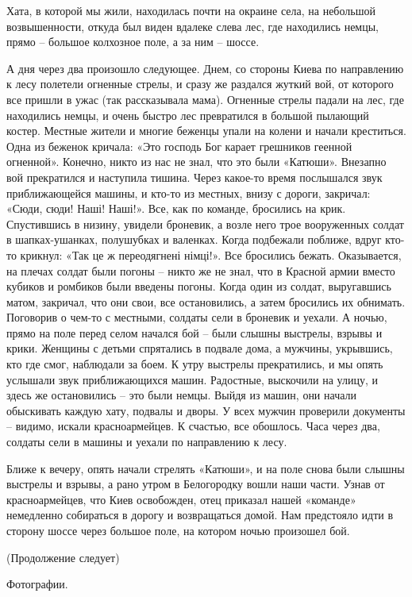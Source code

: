 Хата, в которой мы жили, находилась почти на окраине села, на небольшой
возвышенности, откуда был виден вдалеке слева лес, где находились немцы, прямо
– большое колхозное поле, а за ним – шоссе.

А дня через два произошло следующее. Днем, со стороны Киева по направлению к
лесу полетели огненные стрелы, и сразу же раздался жуткий вой, от которого все
пришли в ужас (так рассказывала мама). Огненные стрелы падали на лес, где
находились немцы, и очень быстро лес превратился в большой пылающий костер.
Местные жители и многие беженцы упали на колени и начали креститься. Одна из
беженок кричала: «Это господь Бог карает грешников геенной огненной». Конечно,
никто из нас не знал, что это были «Катюши». Внезапно вой прекратился и
наступила тишина. Через какое-то время послышался звук приближающейся машины, и
кто-то из местных, внизу с дороги, закричал: «Сюди, сюди! Наші! Наші!». Все,
как по команде, бросились на крик. Спустившись в низину, увидели броневик, а
возле него трое вооруженных солдат в шапках-ушанках, полушубках и валенках.
Когда подбежали поближе, вдруг кто-то крикнул: «Так це ж переодягнені німці!».
Все бросились бежать. Оказывается, на плечах солдат были погоны – никто же не
знал, что в Красной армии вместо кубиков и ромбиков были введены погоны. Когда
один из солдат, выругавшись матом, закричал, что они свои, все остановились, а
затем бросились их обнимать. Поговорив о чем-то с местными, солдаты сели в
броневик и уехали. А ночью, прямо на поле перед селом начался бой – были слышны
выстрелы, взрывы и крики. Женщины с детьми спрятались в подвале дома, а
мужчины, укрывшись, кто где смог, наблюдали за боем. К утру выстрелы
прекратились, и мы опять услышали звук приближающихся машин. Радостные,
выскочили на улицу, и здесь же остановились – это были немцы. Выйдя из машин,
они начали обыскивать каждую хату, подвалы и дворы. У всех мужчин проверили
документы – видимо, искали красноармейцев. К счастью, все обошлось. Часа через
два, солдаты сели в машины и уехали по направлению к лесу.

Ближе к вечеру, опять начали стрелять «Катюши», и на поле снова были слышны
выстрелы и взрывы, а рано утром в Белогородку вошли наши части. Узнав от
красноармейцев, что Киев освобожден, отец приказал нашей «команде» немедленно
собираться в дорогу и возвращаться домой. Нам предстояло идти в сторону шоссе
через большое поле, на котором ночью произошел бой. 

(Продолжение следует)

Фотографии.

